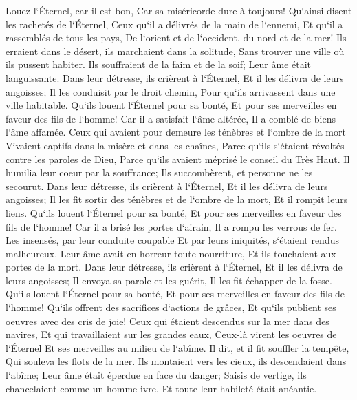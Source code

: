 \verse Louez l`Éternel, car il est bon, Car sa miséricorde dure à toujours! 
\verse Qu`ainsi disent les rachetés de l`Éternel, Ceux qu`il a délivrés de la main de l`ennemi, 
\verse Et qu`il a rassemblés de tous les pays, De l`orient et de l`occident, du nord et de la mer! 
\verse Ils erraient dans le désert, ils marchaient dans la solitude, Sans trouver une ville où ils pussent habiter. 
\verse Ils souffraient de la faim et de la soif; Leur âme était languissante. 
\verse Dans leur détresse, ils crièrent à l`Éternel, Et il les délivra de leurs angoisses; 
\verse Il les conduisit par le droit chemin, Pour qu`ils arrivassent dans une ville habitable. 
\verse Qu`ils louent l`Éternel pour sa bonté, Et pour ses merveilles en faveur des fils de l`homme! 
\verse Car il a satisfait l`âme altérée, Il a comblé de biens l`âme affamée. 
\verse Ceux qui avaient pour demeure les ténèbres et l`ombre de la mort Vivaient captifs dans la misère et dans les chaînes, 
\verse Parce qu`ils s`étaient révoltés contre les paroles de Dieu, Parce qu`ils avaient méprisé le conseil du Très Haut. 
\verse Il humilia leur coeur par la souffrance; Ils succombèrent, et personne ne les secourut. 
\verse Dans leur détresse, ils crièrent à l`Éternel, Et il les délivra de leurs angoisses; 
\verse Il les fit sortir des ténèbres et de l`ombre de la mort, Et il rompit leurs liens. 
\verse Qu`ils louent l`Éternel pour sa bonté, Et pour ses merveilles en faveur des fils de l`homme! 
\verse Car il a brisé les portes d`airain, Il a rompu les verrous de fer. 
\verse Les insensés, par leur conduite coupable Et par leurs iniquités, s`étaient rendus malheureux. 
\verse Leur âme avait en horreur toute nourriture, Et ils touchaient aux portes de la mort. 
\verse Dans leur détresse, ils crièrent à l`Éternel, Et il les délivra de leurs angoisses; 
\verse Il envoya sa parole et les guérit, Il les fit échapper de la fosse. 
\verse Qu`ils louent l`Éternel pour sa bonté, Et pour ses merveilles en faveur des fils de l`homme! 
\verse Qu`ils offrent des sacrifices d`actions de grâces, Et qu`ils publient ses oeuvres avec des cris de joie! 
\verse Ceux qui étaient descendus sur la mer dans des navires, Et qui travaillaient sur les grandes eaux, 
\verse Ceux-là virent les oeuvres de l`Éternel Et ses merveilles au milieu de l`abîme. 
\verse Il dit, et il fit souffler la tempête, Qui souleva les flots de la mer. 
\verse Ils montaient vers les cieux, ils descendaient dans l`abîme; Leur âme était éperdue en face du danger; 
\verse Saisis de vertige, ils chancelaient comme un homme ivre, Et toute leur habileté était anéantie. 
